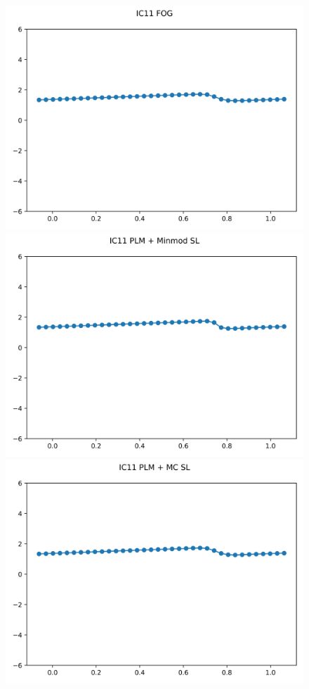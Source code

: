 \documentclass{article}
\begin{document}
\begin{figure}[t]
        \centering
        \includegraphics[width=.95\textwidth]{../../code/pc_IC11Methodfu_plot.png}
    \emp
        \centering
        \includegraphics[width=.95\textwidth]{../../code/pc_IC11Methodpm_plot.png}
    \emp
        \centering
        \includegraphics[width=.95\textwidth]{../../code/pc_IC11Methodpo_plot.png}

\end{figure}
\end{document}
